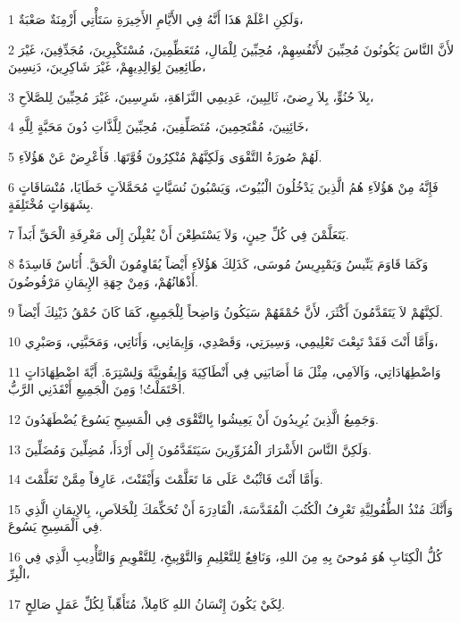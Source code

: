 \par 1 وَلَكِنِ اعْلَمْ هَذَا أَنَّهُ فِي الأَيَّامِ الأَخِيرَةِ سَتَأْتِي أَزْمِنَةٌ صَعْبَةٌ،
\par 2 لأَنَّ النَّاسَ يَكُونُونَ مُحِبِّينَ لأَنْفُسِهِمْ، مُحِبِّينَ لِلْمَالِ، مُتَعَظِّمِينَ، مُسْتَكْبِرِينَ، مُجَدِّفِينَ، غَيْرَ طَائِعِينَ لِوَالِدِيهِمْ، غَيْرَ شَاكِرِينَ، دَنِسِينَ،
\par 3 بِلاَ حُنُوٍّ، بِلاَ رِضىً، ثَالِبِينَ، عَدِيمِي النَّزَاهَةِ، شَرِسِينَ، غَيْرَ مُحِبِّينَ لِلصَّلاَحِ،
\par 4 خَائِنِينَ، مُقْتَحِمِينَ، مُتَصَلِّفِينَ، مُحِبِّينَ لِلَّذَّاتِ دُونَ مَحَبَّةٍ لِلَّهِ،
\par 5 لَهُمْ صُورَةُ التَّقْوَى وَلَكِنَّهُمْ مُنْكِرُونَ قُوَّتَهَا. فَأَعْرِضْ عَنْ هَؤُلاَءِ.
\par 6 فَإِنَّهُ مِنْ هَؤُلاَءِ هُمُ الَّذِينَ يَدْخُلُونَ الْبُيُوتَ، وَيَسْبُونَ نُسَيَّاتٍ مُحَمَّلاَتٍ خَطَايَا، مُنْسَاقَاتٍ بِشَهَوَاتٍ مُخْتَلِفَةٍ.
\par 7 يَتَعَلَّمْنَ فِي كُلِّ حِينٍ، وَلاَ يَسْتَطِعْنَ أَنْ يُقْبِلْنَ إِلَى مَعْرِفَةِ الْحَقِّ أَبَداً.
\par 8 وَكَمَا قَاوَمَ يَنِّيسُ وَيَمْبِرِيسُ مُوسَى، كَذَلِكَ هَؤُلاَءِ أَيْضاً يُقَاوِمُونَ الْحَقَّ. أُنَاسٌ فَاسِدَةٌ أَذْهَانُهُمْ، وَمِنْ جِهَةِ الإِيمَانِ مَرْفُوضُونَ.
\par 9 لَكِنَّهُمْ لاَ يَتَقَدَّمُونَ أَكْثَرَ، لأَنَّ حُمْقَهُمْ سَيَكُونُ وَاضِحاً لِلْجَمِيعِ، كَمَا كَانَ حُمْقُ ذَيْنِكَ أَيْضاً.
\par 10 وَأَمَّا أَنْتَ فَقَدْ تَبِعْتَ تَعْلِيمِي، وَسِيرَتِي، وَقَصْدِي، وَإِيمَانِي، وَأَنَاتِي، وَمَحَبَّتِي، وَصَبْرِي،
\par 11 وَاضْطِهَادَاتِي، وَآلاَمِي، مِثْلَ مَا أَصَابَنِي فِي أَنْطَاكِيَةَ وَإِيقُونِيَّةَ وَلِسْتِرَةَ. أَيَّةَ اضْطِهَادَاتٍ احْتَمَلْتُ! وَمِنَ الْجَمِيعِ أَنْقَذَنِي الرَّبُّ.
\par 12 وَجَمِيعُ الَّذِينَ يُرِيدُونَ أَنْ يَعِيشُوا بِالتَّقْوَى فِي الْمَسِيحِ يَسُوعَ يُضْطَهَدُونَ.
\par 13 وَلَكِنَّ النَّاسَ الأَشْرَارَ الْمُزَوِّرِينَ سَيَتَقَدَّمُونَ إِلَى أَرْدَأَ، مُضِلِّينَ وَمُضَلِّينَ.
\par 14 وَأَمَّا أَنْتَ فَاثْبُتْ عَلَى مَا تَعَلَّمْتَ وَأَيْقَنْتَ، عَارِفاً مِمَّنْ تَعَلَّمْتَ.
\par 15 وَأَنَّكَ مُنْذُ الطُّفُولِيَّةِ تَعْرِفُ الْكُتُبَ الْمُقَدَّسَةَ، الْقَادِرَةَ أَنْ تُحَكِّمَكَ لِلْخَلاَصِ، بِالإِيمَانِ الَّذِي فِي الْمَسِيحِ يَسُوعَ.
\par 16 كُلُّ الْكِتَابِ هُوَ مُوحىً بِهِ مِنَ اللهِ، وَنَافِعٌ لِلتَّعْلِيمِ وَالتَّوْبِيخِ، لِلتَّقْوِيمِ وَالتَّأْدِيبِ الَّذِي فِي الْبِرِّ،
\par 17 لِكَيْ يَكُونَ إِنْسَانُ اللهِ كَامِلاً، مُتَأَهِّباً لِكُلِّ عَمَلٍ صَالِحٍ.

